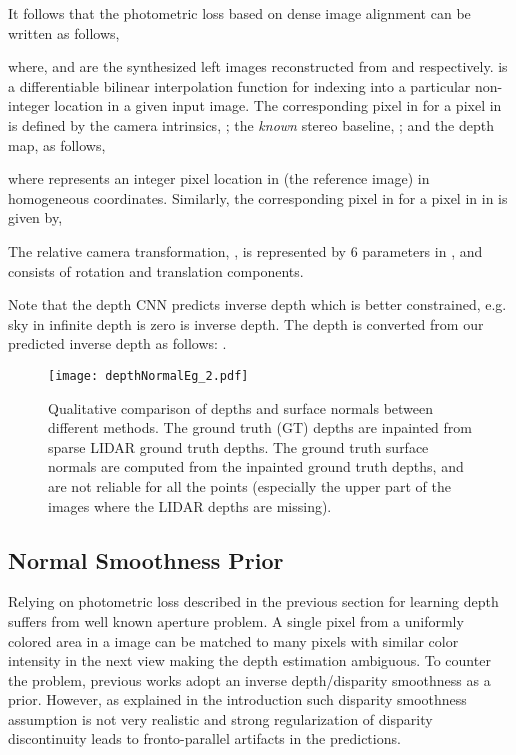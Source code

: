 \documentclass[letterpaper, 10 pt, conference]{ieeeconf}
\begin{document}
It follows that the photometric loss based on dense image alignment can be written as follows,

where,  and  are the synthesized left images reconstructed from  and  respectively.  is a differentiable bilinear interpolation function \cite{jaderberg2015stn} for indexing into a particular non-integer location in a given input image.
The corresponding pixel  in  for a pixel  in  is defined by the camera intrinsics, ; the \emph{known} stereo baseline, ; and the depth map,  as follows,

where  represents an integer pixel location in  (the reference image) in homogeneous coordinates. Similarly, the corresponding pixel  in  for a pixel in  in  is given by, 

The relative camera transformation, , is represented by 6 parameters in , and consists of rotation and translation components.

 Note that the depth CNN predicts inverse depth  which is better constrained, e.g. sky in infinite depth is zero is inverse depth. The depth is converted from our predicted inverse depth as follows: . 



\begin{figure*}[t!] 
\centering
\texttt{[image: depthNormalEg\_2.pdf]}
\caption{Qualitative comparison of depths and surface normals between different methods. 
The ground truth (GT) depths are inpainted from sparse LIDAR ground truth depths. The ground truth surface normals are computed from the inpainted ground truth depths, and are not reliable for all the points (especially the upper part of the images where the LIDAR depths are missing).\vspace{-5mm}}
\label{fig:depthNormalEg}
\end{figure*}

\subsection{Normal Smoothness Prior}
 Relying on photometric loss described in the previous section for learning depth suffers from well known aperture problem. A single pixel from a uniformly colored area in a  image can be matched to many pixels with similar color intensity in the next view making the depth estimation ambiguous. 
 To counter the problem, previous works \cite{garg2016depth} \cite{godard2016depth} \cite{zhan2018depthVO} adopt an inverse depth/disparity smoothness as a prior. 
 However, as explained in the introduction such disparity smoothness assumption is not very realistic and strong regularization of disparity discontinuity leads to fronto-parallel artifacts in the predictions.
 
\end{document}
